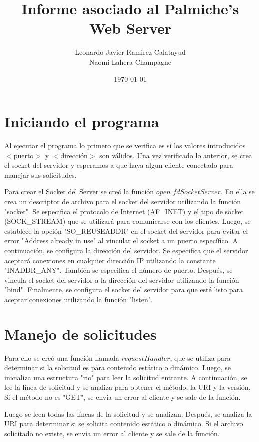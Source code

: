 \documentclass{article}
\title{Informe asociado al Palmiche's Web Server}
\author{Leonardo Javier Ramirez Calatayud\\
	Naomi Lahera Champagne\\}
\date{\today}
\begin{document}
	\maketitle
	\section{Iniciando el programa}  
		Al ejecutar el programa lo primero que se verifica es si los valores introducidos $<$puerto$>$ y $<$dirección$>$ son válidos.
		Una vez verificado lo anterior, se crea el socket del servidor y esperamos a que haya algun cliente conectado para manejar sus solicitudes.
		
		
		Para crear el Socket del Server se creó la función $open\_fdSocketServer$. En ella se crea un descriptor de archivo para el socket del servidor utilizando la función "socket". Se especifica el protocolo de Internet (AF\_INET) y el tipo de socket (SOCK\_STREAM) que se utilizará para comunicarse con los clientes. Luego, se establece la opción "SO\_REUSEADDR" en el socket del servidor para evitar el error "Address already in use" al vincular el socket a un puerto específico. A continuación, se configura la dirección del servidor. Se especifica que el servidor aceptará conexiones en cualquier dirección IP utilizando la constante "INADDR\_ANY". También se especifica el número de puerto. Después, se vincula el socket del servidor a la dirección del servidor utilizando la función "bind". Finalmente, se configura el socket del servidor para que esté listo para aceptar conexiones utilizando la función "listen".
		
	\section{Manejo de solicitudes}
	
		Para ello se creó una función llamada $requestHandler$, que se utiliza para determinar si la solicitud es para contenido estático o dinámico. Luego, se inicializa una estructura "rio" para leer la solicitud entrante. A continuación, se lee la línea de solicitud y se analiza para obtener el método, la URI y la versión. Si el método no es "GET", se envía un error al cliente y se sale de la función. 
		  
		  
		Luego se leen todas las líneas de la solicitud y se analizan. Después, se analiza la URI para determinar si se solicita contenido estático o dinámico. Si el archivo solicitado no existe, se envía un error al cliente y se sale de la función. 
		   
\end{document}
